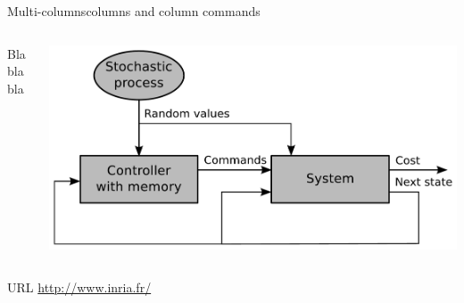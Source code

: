 \begin{frame}{Multi-columns}{columns and column commands}
    \begin{columns}
        \begin{column}{0.5\textwidth}

            Blablabla

        \end{column}
        \begin{column}{0.5\textwidth}

            \begin{center}
                \includegraphics[width=.99\linewidth]{fig/test}
            \end{center}

        \end{column}
    \end{columns}
\end{frame}
\note{
}


\begin{frame}{URL}
    \url{http://www.inria.fr/}
\end{frame}
\note{
}
